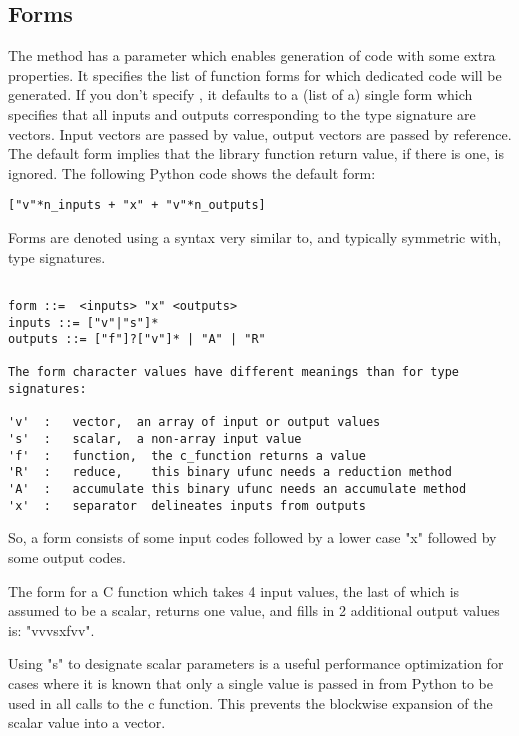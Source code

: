 \subsection{Forms}

The  method has a parameter  which enables
generation of code with some extra properties.  It specifies the list of
function forms for which dedicated code will be generated.  If you don't
specify , it defaults to a (list of a) single form which specifies
that all inputs and outputs corresponding to the type signature are vectors.
Input vectors are passed by value, output vectors are passed by reference.  The
default form implies that the library function return value, if there is one,
is ignored.  The following Python code shows the default form:

\begin{verbatim}
["v"*n_inputs + "x" + "v"*n_outputs] 
\end{verbatim}

Forms are denoted using a syntax very similar to, and typically symmetric with,
type signatures.

\begin{verbatim}

form ::=  <inputs> "x" <outputs>
inputs ::= ["v"|"s"]*
outputs ::= ["f"]?["v"]* | "A" | "R"

The form character values have different meanings than for type
signatures:

'v'  :   vector,  an array of input or output values
's'  :   scalar,  a non-array input value
'f'  :   function,  the c_function returns a value
'R'  :   reduce,    this binary ufunc needs a reduction method
'A'  :   accumulate this binary ufunc needs an accumulate method
'x'  :   separator  delineates inputs from outputs

\end{verbatim}

So, a form consists of some input codes followed by a lower case "x" followed
by some output codes.  

The form for a C function which takes 4 input values, the last of which is
assumed to be a scalar, returns one value, and fills in 2 additional output
values is:  "vvvsxfvv".

Using "s" to designate scalar parameters is a useful performance
optimization for cases where it is known that only a single value is
passed in from Python to be used in all calls to the c function.  This
prevents the blockwise expansion of the scalar value into a vector.


